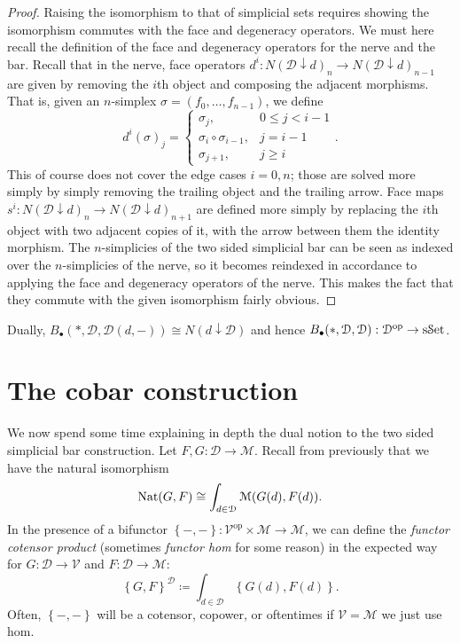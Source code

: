 \begin{proof}
	Raising the isomorphism to that of simplicial sets requires showing the isomorphism commutes with the face and degeneracy operators. We must here recall the definition of the face and degeneracy operators for the nerve and the bar. Recall that in the nerve, face operators $d^i : N(\mathcal{D} \downarrow d)_n \to N(\mathcal{D} \downarrow d)_{n-1} $ are given by removing the $i$th object and composing the adjacent morphisms. That is, given an $n$-simplex $\sigma = (f_0, \ldots ,f_{n-1} )$, we define
	\[
		d^i(\sigma)_j =
		\begin{cases}
			\sigma_j,& 0\leq j<i-1\\
			\sigma_i\circ \sigma_{i-1} ,&j=i-1\\
			\sigma_{j+1} ,&j\geq i
		\end{cases}
	.\]
	This of course does not cover the edge cases $i=0,n$; those are solved more simply by simply removing the trailing object and the trailing arrow. Face maps $s^i : N(\mathcal{D} \downarrow d)_n \to N(\mathcal{D} \downarrow d)_{n+1} $ are defined more simply by replacing the $i$th object with two adjacent copies of it, with the arrow between them the identity morphism. The $n$-simplicies of the two sided simplicial bar can be seen as indexed over the $n$-simplicies of the nerve, so it becomes reindexed in accordance to applying the face and degeneracy operators of the nerve. This makes the fact that they commute with the given isomorphism fairly obvious.
 \end{proof}

 Dually, $B_{\bullet} (*,\mathcal{D} ,\mathcal{D} (d,-))\cong N(d\downarrow \mathcal{D} )$ and hence $B_{\bullet} (*,\mathcal{D} ,\mathcal{D} ) : \mathcal{D} ^{\mathrm{op}}  \to \mathrm{s}\mathcal{S}\mathrm{et} $.

 \section{The cobar construction}

We now spend some time explaining in depth the dual notion to the two sided simplicial bar construction. Let $F,G : \mathcal{D}  \to \mathcal{M} $. Recall from previously that we have the natural isomorphism
\[
	\operatorname{Nat}(G,F)\cong \int_{d\in \mathcal{D} } \mathcal{M} (G(d),F(d))
.\]
In the presence of a bifunctor $\left\{ -,- \right\} : \mathcal{V} ^{\mathrm{op}} \times \mathcal{M}  \to \mathcal{M} $, we can define the \emph{functor cotensor product} (sometimes \emph{functor hom} for some reason) in the expected way for $G : \mathcal{D}  \to \mathcal{V} $ and $F : \mathcal{D}  \to \mathcal{M} $:
\[
	\left\{ G,F \right\} ^{\mathcal{D} } \coloneqq \int_{d\in \mathcal{D} } \left\{ G(d),F(d) \right\} 
.\]
Often, $\left\{ -,- \right\} $ will be a cotensor, copower, or oftentimes if $\mathcal{V} =\mathcal{M} $ we just use hom.

